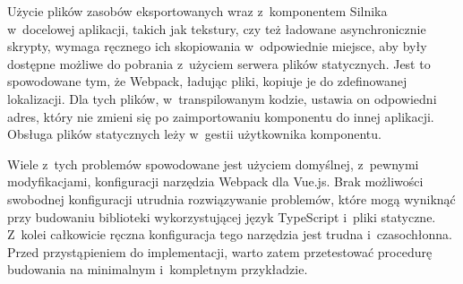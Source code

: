 Użycie plików zasobów eksportowanych wraz z~komponentem Silnika w~docelowej aplikacji, takich jak tekstury, czy też ładowane asynchronicznie skrypty, wymaga ręcznego ich skopiowania w~odpowiednie miejsce, aby były dostępne możliwe do pobrania z~użyciem serwera plików statycznych. Jest to spowodowane tym, że Webpack, ładując pliki, kopiuje je do zdefinowanej lokalizacji. Dla tych plików, w~transpilowanym kodzie, ustawia on odpowiedni adres, który nie zmieni się po zaimportowaniu komponentu do innej aplikacji. Obsługa plików statycznych leży w~gestii użytkownika komponentu.

Wiele z~tych problemów spowodowane jest użyciem domyślnej, z~pewnymi modyfikacjami, konfiguracji narzędzia Webpack dla Vue.js. Brak możliwości swobodnej konfiguracji utrudnia rozwiązywanie problemów, które mogą wyniknąć przy budowaniu biblioteki wykorzystującej język TypeScript i~pliki statyczne. Z~kolei całkowicie ręczna konfiguracja tego narzędzia jest trudna i~czasochłonna. Przed przystąpieniem do implementacji, warto zatem przetestować procedurę budowania na minimalnym i~kompletnym przykładzie.

